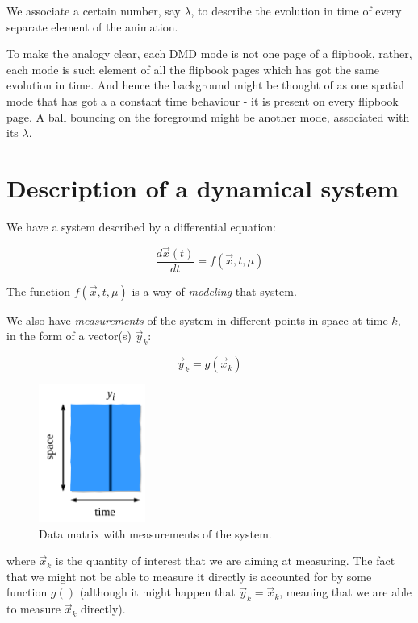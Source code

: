 \documentclass[10pt,twocolumn]{article}
\begin{document}
We associate a certain number, say $\lambda$, to describe the evolution in time of every separate element of the animation.

To make the analogy clear, each DMD mode is not one page of a flipbook, rather, each mode is such element of all the flipbook pages which has got the same evolution in time. And hence the background might be thought of as one spatial mode that has got a a constant time behaviour - it is present on every flipbook page. A ball bouncing on the foreground might be another mode, associated with its $\lambda$. 


\section{Description of a dynamical system}

We have a system described by a differential equation:

\begin{equation} \label{eq:system_DE}
\frac{d \vec{x}(t)}{dt} = f(\vec{x}, t, \mu)
\end{equation}

The function $f(\vec{x}, t, \mu)$ is a way of \textit{modeling} that system.

We also have \textit{measurements} of the system in different points in space at time $k$, in the form of a vector(s) $\vec{y}_k$:

\begin{equation}
\vec{y}_k = g(\vec{x}_k)
\end{equation}

\begin{figure}
\centering\includegraphics[width=3.5cm]{data-matrix.png}
\caption{Data matrix with measurements of the system.}
\label{fig:data-matrix}
\end{figure}

where $\vec{x}_k$ is the quantity of interest that we are aiming at measuring. The fact that we might not be able to measure it directly is accounted for by some function $g()$ (although it might happen that $\vec{y}_k = \vec{x}_k$, meaning that we are able to measure $\vec{x}_k$ directly).
\end{document}
